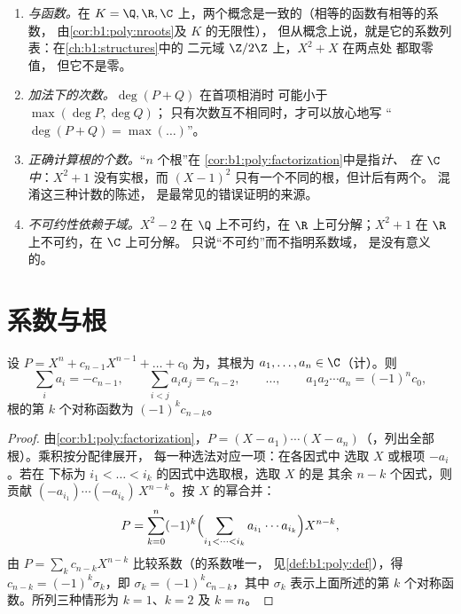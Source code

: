 \begin{remark}[多项式的常见误区]\label{rem:b1:poly:pitfalls}
\begin{enumerate}
  \item \emph{与函数。}在 $K = \Q, \R, \C$
        上，两个概念是一致的（相等的函数有相等的系数，
        由\cref{cor:b1:poly:nroots}及 $K$ 的无限性），
        但从概念上说，就是它的系数列表：在\cref{ch:b1:structures}中的
        二元域 $\Z/2\Z$ 上，$X^2 + X$ 在两点处
        都取零值，
        但它不是零。
  \item \emph{加法下的次数。}$\deg(P + Q)$ 在首项相消时
        可能小于 $\max(\deg P, \deg Q)$；
        只有次数互不相同时，才可以放心地写
        “$\deg(P + Q) = \max(\dots)$”。
  \item \emph{正确计算根的个数。}“$n$ 个根”在
        \cref{cor:b1:poly:factorization}中是指\emph{计、
        在 $\C$ 中}：$X^2 + 1$ 没有实根，而
        $(X-1)^2$ 只有一个不同的根，但计后有两个。
        混淆这三种计数的陈述，
        是最常见的错误证明的来源。
  \item \emph{不可约性依赖于域。}$X^2 - 2$ 在
        $\Q$ 上不可约，在 $\R$ 上可分解；$X^2 + 1$ 在
        $\R$ 上不可约，在 $\C$ 上可分解。
        只说“不可约”而不指明系数域，
        是没有意义的。
\end{enumerate}
\end{remark}

\section{系数与根}

\begin{theorem}[韦达公式]\label{thm:b1:poly:vieta}
设 $P = X^n + c_{n-1} X^{n-1} + \dots + c_0$ 为，其根为
$a_1, \dots, a_n \in \C$（计）。则
\[
\sum_i a_i = -c_{n-1},
\qquad
\sum_{i < j} a_i a_j = c_{n-2},
\qquad \dots, \qquad
a_1 a_2 \cdots a_n = (-1)^n c_0 ,
\]
根的第 $k$ 个对称函数为 $(-1)^k c_{n-k}$。
\end{theorem}

\begin{proof}
由\cref{cor:b1:poly:factorization}，$P = (X - a_1)\cdots(X -
a_n)$（，列出全部根）。乘积按分配律展开，
每一种选法对应一项：在各因式中
选取 $X$ 或根项 $-a_i$。若在
下标为 $i_1 < \dots < i_k$ 的因式中选取根，选取 $X$ 的是
其余 $n - k$ 个因式，则贡献 $(-a_{i_1})\cdots(-a_{i_k})\,X^{n-k}$。按
$X$ 的幂合并：
\[
P = \sum_{k=0}^{n} (-1)^k
\Bigl(\sum_{i_1 < \dots < i_k} a_{i_1}\cdots a_{i_k}\Bigr)
X^{n-k} ,
\]
由 $P = \sum_k c_{n-k}X^{n-k}$ 比较系数（的系数唯一，
见\cref{def:b1:poly:def}），得 $c_{n-k} = (-1)^k
\sigma_k$，即 $\sigma_k = (-1)^kc_{n-k}$，其中 $\sigma_k$
表示上面所述的第 $k$ 个对称函数。所列三种情形为
$k = 1$、$k = 2$ 及 $k = n$。
\end{proof}

